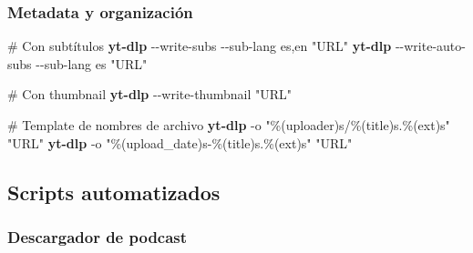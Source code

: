 \documentclass[
  11pt,
  letterpaper,
  oneside,
  openany]{scrbook}
\newenvironment{Shaded}{}{}
\newcommand{\AttributeTok}[1]{\textcolor[rgb]{0.84,0.23,0.29}{#1}}
\newcommand{\CommentTok}[1]{\textcolor[rgb]{0.42,0.45,0.49}{#1}}
\newcommand{\ExtensionTok}[1]{\textcolor[rgb]{0.84,0.23,0.29}{\textbf{#1}}}
\newcommand{\NormalTok}[1]{\textcolor[rgb]{0.14,0.16,0.18}{#1}}
\newcommand{\StringTok}[1]{\textcolor[rgb]{0.01,0.18,0.38}{#1}}
\begin{document}
\subsubsection{Metadata y
organización}\label{metadata-y-organizaciuxf3n}

\begin{Shaded}
\begin{Highlighting}[]
\CommentTok{\# Con subtítulos}
\ExtensionTok{yt{-}dlp} \AttributeTok{{-}{-}write{-}subs} \AttributeTok{{-}{-}sub{-}lang}\NormalTok{ es,en }\StringTok{"URL"}
\ExtensionTok{yt{-}dlp} \AttributeTok{{-}{-}write{-}auto{-}subs} \AttributeTok{{-}{-}sub{-}lang}\NormalTok{ es }\StringTok{"URL"}

\CommentTok{\# Con thumbnail}
\ExtensionTok{yt{-}dlp} \AttributeTok{{-}{-}write{-}thumbnail} \StringTok{"URL"}

\CommentTok{\# Template de nombres de archivo}
\ExtensionTok{yt{-}dlp} \AttributeTok{{-}o} \StringTok{"\%(uploader)s/\%(title)s.\%(ext)s"} \StringTok{"URL"}
\ExtensionTok{yt{-}dlp} \AttributeTok{{-}o} \StringTok{"\%(upload\_date)s{-}\%(title)s.\%(ext)s"} \StringTok{"URL"}
\end{Highlighting}
\end{Shaded}

\subsection{Scripts automatizados}\label{scripts-automatizados}

\subsubsection{Descargador de podcast}\label{descargador-de-podcast}
\end{document}
